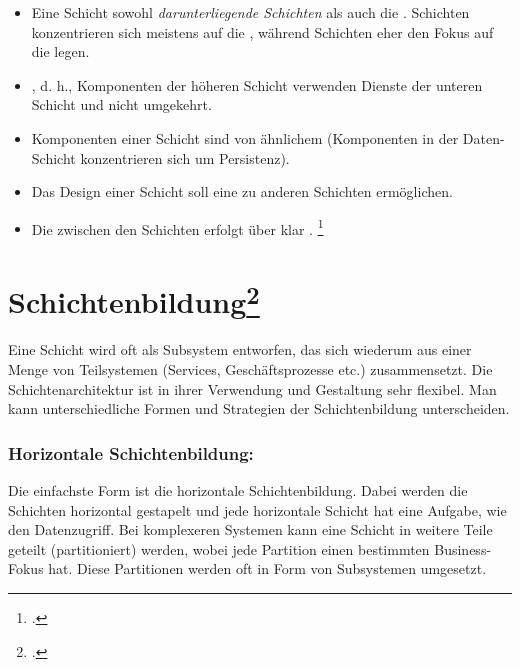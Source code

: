 \documentclass{lehramt-informatik-haupt}
\begin{document}
\begin{itemize}
\item Eine Schicht  sowohl \emph{darunterliegende
Schichten} als auch die . 
Schichten konzentrieren sich meistens auf die , während
 Schichten eher den Fokus auf die
 legen.

\item {}, d. h., Komponenten der höheren
Schicht verwenden Dienste der unteren Schicht und nicht umgekehrt.

\item Komponenten  einer Schicht sind von ähnlichem
 (\zB Komponenten in der Daten-Schicht
konzentrieren sich um Persistenz).

\item Das Design einer Schicht soll eine  zu
anderen Schichten ermöglichen.

\item Die  zwischen den Schichten erfolgt über klar
.
\footcite[Seite 211]{schatten}
\end{itemize}

%

\section{Schichtenbildung\footcite[Seite 11]{sosy:fs:4}}

Eine Schicht wird oft als Subsystem entworfen, das sich wiederum aus
einer Menge von Teilsystemen (\zB Services, Geschäftsprozesse etc.)
zusammensetzt. Die Schichtenarchitektur ist in ihrer Verwendung und
Gestaltung sehr flexibel. Man kann unterschiedliche Formen und
Strategien der Schichtenbildung unterscheiden.

\subsubsection{Horizontale Schichtenbildung:}

Die einfachste Form ist die horizontale Schichtenbildung. Dabei werden
die Schichten horizontal gestapelt und jede horizontale Schicht hat
eine Aufgabe, wie \zB den Datenzugriff. Bei komplexeren Systemen
kann eine Schicht in weitere Teile geteilt (partitioniert) werden,
wobei jede Partition einen bestimmten Business-Fokus hat. Diese
Partitionen werden oft in Form von Subsystemen umgesetzt.
\end{document}
